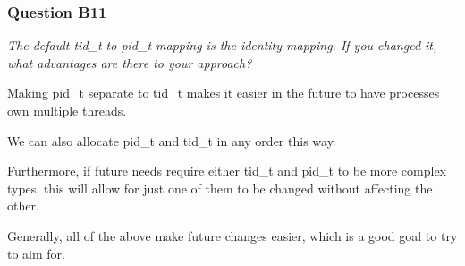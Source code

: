 \subsubsection*{Question B11} %
\textit{The default tid\_t to pid\_t mapping is the identity mapping. If you changed it, what advantages are there to your approach?}

Making pid\_t separate to tid\_t makes it easier in the future to have processes
own multiple threads.

We can also allocate pid\_t and tid\_t in any order this way.

Furthermore, if future needs require either tid\_t and pid\_t to be more complex
types, this will allow for just one of them to be changed without affecting the
other.

Generally, all of the above make future changes easier, which is a good goal to
try to aim for.
